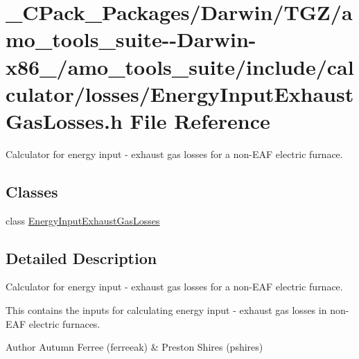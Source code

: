\hypertarget{___c_pack___packages_2_darwin_2_t_g_z_2amo__tools__suite--_darwin-x86__64_2amo__tools__suite_2inb4ade26cda2705ae1b52b8f5723047ab}{}\section{\+\_\+\+C\+Pack\+\_\+\+Packages/\+Darwin/\+T\+G\+Z/amo\+\_\+tools\+\_\+suite-\/-\/\+Darwin-\/x86\+\_/amo\+\_\+tools\+\_\+suite/include/calculator/losses/\+Energy\+Input\+Exhaust\+Gas\+Losses.h File Reference}
\label{___c_pack___packages_2_darwin_2_t_g_z_2amo__tools__suite--_darwin-x86__64_2amo__tools__suite_2inb4ade26cda2705ae1b52b8f5723047ab}


Calculator for energy input -\/ exhaust gas losses for a non-\/\+E\+AF electric furnace.  


\subsection*{Classes}
\begin{DoxyCompactItemize}
\item 
class \hyperlink{class_energy_input_exhaust_gas_losses}{Energy\+Input\+Exhaust\+Gas\+Losses}
\end{DoxyCompactItemize}


\subsection{Detailed Description}
Calculator for energy input -\/ exhaust gas losses for a non-\/\+E\+AF electric furnace. 

This contains the inputs for calculating energy input -\/ exhaust gas losses in non-\/\+E\+AF electric furnaces.

\begin{DoxyAuthor}{Author}
Autumn Ferree (ferreeak) \& Preston Shires (pshires) 
\end{DoxyAuthor}
